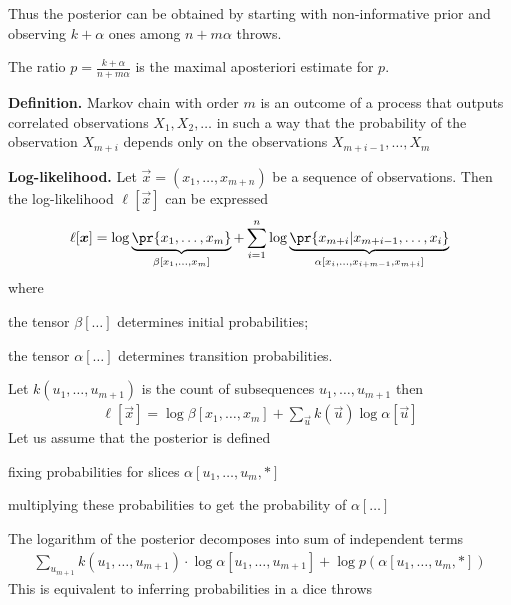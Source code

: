 \documentclass[landscape,footrule]{foils}
\begin{document}
Thus the posterior can be obtained by starting with non-informative prior and observing $k+\alpha$ ones among $n + m\alpha$ throws.  
\begin{triangles}
\item The ratio $p=\frac{k+\alpha}{n+m\alpha}$ is the maximal aposteriori estimate for $p$.
\end{triangles}




\textbf{Definition.}
Markov chain with order $m$ is an outcome of a process that outputs correlated observations $X_1, X_2,\ldots$ in such a way that the probability of the observation $X_{m+i}$ depends only on the observations $X_{m+i-1},\ldots, X_{m}$

\textbf{Log-likelihood.} Let $\vec{x}=(x_1,\ldots, x_{m+n})$ be a sequence of observations. Then the log-likelihood $\ell[\vec{x}]$ can be expressed
\begin{align*}
\ell[\vec{x}]=\log \underbrace{\pr{x_1,\ldots,x_m}}_{\beta[x_1,\ldots,x_m]} + \sum_{i=1}^n \log \underbrace{\pr{x_{m+i}|x_{m+i-1},\ldots, x_i}}_{\alpha[x_i,\ldots, x_{i+m-1}, x_{m+i}]} 
\end{align*}
where 
\begin{triangles}
\item the tensor $\beta[\ldots]$ determines initial probabilities;
\item the tensor $\alpha[\ldots]$ determines transition probabilities. 
\end{triangles}


Let $k(u_1,\ldots,u_{m+1})$ is the count of subsequences $u_1,\ldots,u_{m+1}$ then 
\begin{align*}
\ell[\vec{x}]=\log \beta[x_1,\ldots,x_m] + \sum_{\vec{u}} k(\vec{u})\log\alpha[\vec{u}] 
\end{align*}
Let us assume that the posterior is defined
\begin{triangles}
\item fixing probabilities for slices $\alpha[u_1,\ldots,u_{m}, *]$
\item multiplying these probabilities to get the probability of $\alpha[\ldots]$
\end{triangles}
\vspace*{1cm}

The logarithm of the posterior decomposes into sum of independent terms
\begin{align*}
\sum_{u_{m+1}} k(u_1,\ldots,u_{m+1})\cdot\log \alpha[u_1,\ldots,u_{m+1}]+ \log p(\alpha[u_1,\ldots,u_{m}, *])
\end{align*}
This is equivalent to inferring probabilities in a dice throws \vspace*{-2ex}
\end{document}
